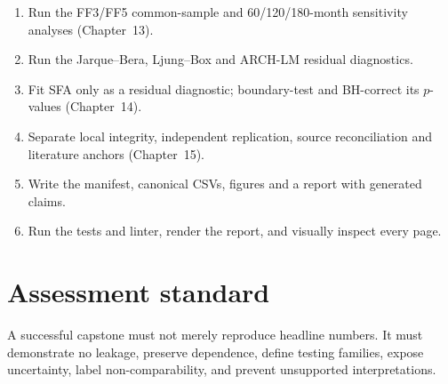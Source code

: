 \begin{enumerate}
  Test the rolling-minus-benchmark increments with HAC and a block
  bootstrap.
\item
  Run the FF3/FF5 common-sample and 60/120/180-month sensitivity analyses
  (Chapter~13).
\item
  Run the Jarque--Bera, Ljung--Box and ARCH-LM residual diagnostics.
\item
  Fit SFA only as a residual diagnostic; boundary-test and BH-correct its
  $p$-values (Chapter~14).
\item
  Separate local integrity, independent replication, source reconciliation
  and literature anchors (Chapter~15).
\item
  Write the manifest, canonical CSVs, figures and a report with generated
  claims.
\item
  Run the tests and linter, render the report, and visually inspect every
  page.
\end{enumerate}

\hypertarget{assessment-standard}{%
\section{Assessment standard}\label{assessment-standard}}

A successful capstone must not merely reproduce headline numbers. It
must demonstrate no leakage, preserve dependence, define testing
families, expose uncertainty, label non-comparability, and prevent
unsupported interpretations.

